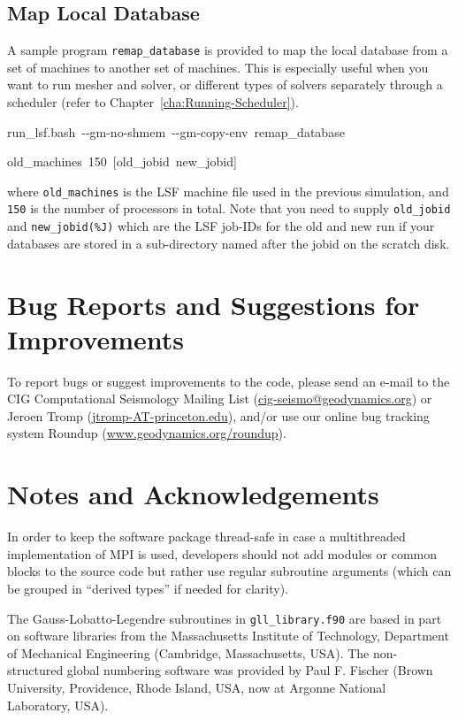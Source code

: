\documentclass[oneside,english]{book}
\newenvironment{lyxcode}
{\begin{list}{}{
\setlength{\rightmargin}{\leftmargin}
\setlength{\listparindent}{0pt}%
\raggedright
\setlength{\itemsep}{0pt}
\setlength{\parsep}{0pt}
\normalfont\ttfamily}%
 \item[]}
{\end{list}}
\newcommand{\urlwithparentheses}[1]{(\url{#1})}
\begin{document}
\section{Map Local Database}

A sample program \texttt{remap\_database} is provided to map the local
database from a set of machines to another set of machines. This is
especially useful when you want to run mesher and solver, or different
types of solvers separately through a scheduler (refer to Chapter~\ref{cha:Running-Scheduler}).

\begin{lyxcode}
run\_lsf.bash~-{}-gm-no-shmem~-{}-gm-copy-env~remap\_database

old\_machines~150~{[}old\_jobid~new\_jobid]
\end{lyxcode}
where \texttt{old\_machines} is the LSF machine file used in the previous
simulation, and \texttt{150} is the number of processors in total.
Note that you need to supply \texttt{old\_jobid} and \texttt{new\_jobid(\%J)}
which are the LSF job-IDs for the old and new run if your databases
are stored in a sub-directory named after the jobid on the scratch
disk.


\chapter*{\label{cha:Bug-Reports-and}Bug Reports and Suggestions for Improvements}

To report bugs or suggest improvements to the code, please send an
e-mail to the CIG Computational Seismology Mailing List \urlwithparentheses{cig-seismo@geodynamics.org}
or Jeroen Tromp \urlwithparentheses{jtromp-AT-princeton.edu}, and/or use our online
bug tracking system Roundup \urlwithparentheses{www.geodynamics.org/roundup}.


\chapter*{\label{cha:Notes-and-Acknowledgements}Notes and Acknowledgements}

In order to keep the software package thread-safe in case a multithreaded
implementation of MPI is used, developers should not add modules or
common blocks to the source code but rather use regular subroutine
arguments (which can be grouped in ``derived types'' if needed for
clarity).

The Gauss-Lobatto-Legendre subroutines in \texttt{gll\_library.f90}
are based in part on software libraries from the Massachusetts Institute
of Technology, Department of Mechanical Engineering (Cambridge, Massachusetts, USA).
The non-structured global numbering software was provided by Paul
F. Fischer (Brown University, Providence, Rhode Island, USA, now at Argonne National Laboratory, USA).
\end{document}
